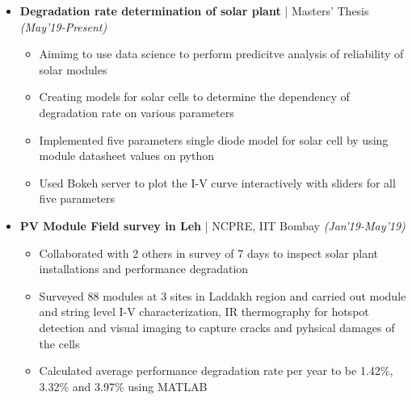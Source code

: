 \documentclass[a4paper,10pt]{article}
\newcommand{\isep}{-2 pt}
\begin{document}
\begin{itemize} \itemsep \isep 
\vspace{-0.0cm}

\item \textbf{\large Degradation rate determination of solar plant} | Masters' Thesis \hfill \emph{(May'19-Present)} \\
	\begin{itemize}\itemsep \isep
	\vspace{-0.7cm}
		\item Aimimg to use data science to perform predicitve analysis of reliability of solar modules
	\item Creating models for solar cells to determine the dependency of degradation rate on various parameters
		\item Implemented five parameters single diode model for solar cell by using module datasheet values on python
	\item Used Bokeh server to plot the I-V curve interactively with sliders for all five parameters
    \end{itemize}

\vspace{-0.18cm}
	
\item \textbf{\large PV Module Field survey in Leh} | NCPRE, IIT Bombay \hfill \emph{(Jan'19-May'19)} \\
	\begin{itemize}\itemsep \isep
    \vspace{-0.70cm}
\item Collaborated with 2 others in survey of 7 days to inspect solar plant installations and performance degradation
\item Surveyed 88 modules at 3 sites in Laddakh region and carried out module and string level I-V characterization, IR thermography for hotspot detection and visual imaging to capture cracks and pyhsical damages of the cells
\item Calculated average performance degradation rate per year to be  1.42\%, 3.32\% and 3.97\% using MATLAB	
\end{itemize} 
\end{itemize}
\end{document}

